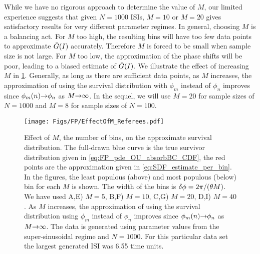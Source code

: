 While we have no rigorous approach to determine the value of $M$, our limited
experience suggests that given $N=1000$ ISIs, $M=10$ or $M=20$ gives satisfactory
results for very different parameter regimes. In general, choosing $M$ is a
balancing act. For $M$ too high, the resulting bins will have too few data
points to approximate ${ \bar{G} }(I)$ accurately. Therefore $M$ is forced to be small
when sample size is not large. For $M$ too low, the approximation of the phase
shifts will be poor, leading to a biased estimate of ${ \bar{G} }(I)$. We illustrate the
effect of increasing $M$ in \cref{fig:effect_of_M}. Generally, as long as there
are sufficient data points, as $M$ increases, the approximation of using the
survival distribution with $\phi_m$ instead of $\phi_n$ improves since
$\phi_m(n) {\rightarrow} \phi_n$ as $M {\rightarrow} \infty$. In the sequel, we will use $M=20$ for
sample sizes of $N=1000$ and $M=8$ for sample sizes of $N=100$.

\begin{figure}[h]
\begin{center}
\texttt{[image: Figs/FP/EffectOfM\_Referees.pdf]}
\caption[Effect of Bin-size]{Effect of $M$, the number of bins, on the
approximate survival distribution. The full-drawn blue curve is the true survivor distribution
given in \cref{eq:FP_pde_OU_absorbBC_CDF}, the red points are the approximation
given in \cref{eq:SDF_estimate_per_bin}.  
In the figures, the least populous (above) and most populous (below) bin for
each $M$ is shown. The width of the bins is ${ \delta \phi } = {2\pi}/{({ \theta} M)}$.
We have used A,E) $M=5$, B,F) $M=10$, C,G) $M=20$,
D,I) $M=40$. As $M$ increases, the approximation of using the survival
distribution using $\phi_m$ instead of $\phi_n$ improves since $\phi_m(n) {\rightarrow}
\phi_n$ as $M {\rightarrow} \infty$. The data is generated using parameter
values from the super-sinusoidal regime and $N=1000$. For this
particular data set the largest generated ISI was 6.55 time units.}
\label{fig:effect_of_M}
\end{center}
\end{figure}

